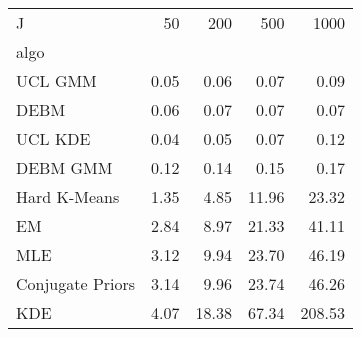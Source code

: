 \begin{tabular}{lrrrr}
\toprule
J & 50 & 200 & 500 & 1000 \\
algo &  &  &  &  \\
\midrule
UCL GMM & 0.05 & 0.06 & 0.07 & 0.09 \\
DEBM & 0.06 & 0.07 & 0.07 & 0.07 \\
UCL KDE & 0.04 & 0.05 & 0.07 & 0.12 \\
DEBM GMM & 0.12 & 0.14 & 0.15 & 0.17 \\
Hard K-Means & 1.35 & 4.85 & 11.96 & 23.32 \\
EM & 2.84 & 8.97 & 21.33 & 41.11 \\
MLE & 3.12 & 9.94 & 23.70 & 46.19 \\
Conjugate Priors & 3.14 & 9.96 & 23.74 & 46.26 \\
KDE & 4.07 & 18.38 & 67.34 & 208.53 \\
\bottomrule
\end{tabular}

